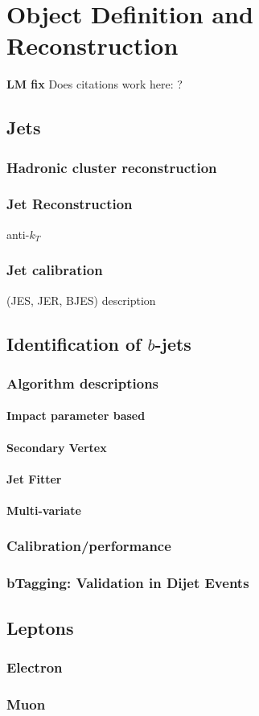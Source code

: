 \chapter{Object Definition and Reconstruction}
\label{sec:obj}
\textbf{LM fix} Does citations work here: \cite{trig-evtGen}?


\section{Jets}
\label{sec:obj-jets}
  \subsection{Hadronic cluster reconstruction}
  \subsection{Jet Reconstruction}
   anti-$k_T$
   \subsection{Jet calibration}
    (JES, JER, BJES) description
    
   \section{Identification of $b$-jets}
   \label{sec:obj-bjets} 
  \subsection{Algorithm descriptions}
  \subsubsection{Impact parameter based}
  \subsubsection{Secondary Vertex}
  \subsubsection{Jet Fitter}
  \subsubsection{Multi-variate}
  \label{sec:obj-bjets_MV2}
  \subsection{Calibration/performance}
  \subsection{bTagging: Validation in Dijet Events}
    
  \section{Leptons}   
  \subsection{Electron}
  \label{sec:obj-electron}
  \subsection{Muon}
  \label{sec:obj-muon}
    
